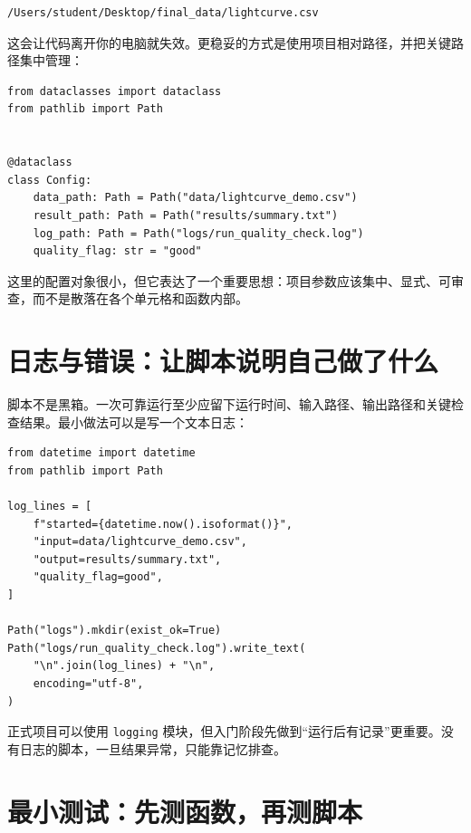 \begin{lstlisting}[style=terminal]
/Users/student/Desktop/final_data/lightcurve.csv
\end{lstlisting}

这会让代码离开你的电脑就失效。更稳妥的方式是使用项目相对路径，并把关键路径集中管理：

\begin{examplebox}[最小配置对象]
\begin{lstlisting}[style=pythonstyle]
from dataclasses import dataclass
from pathlib import Path


@dataclass
class Config:
    data_path: Path = Path("data/lightcurve_demo.csv")
    result_path: Path = Path("results/summary.txt")
    log_path: Path = Path("logs/run_quality_check.log")
    quality_flag: str = "good"
\end{lstlisting}
\end{examplebox}

这里的配置对象很小，但它表达了一个重要思想：项目参数应该集中、显式、可审查，而不是散落在各个单元格和函数内部。

\section{日志与错误：让脚本说明自己做了什么}

脚本不是黑箱。一次可靠运行至少应留下运行时间、输入路径、输出路径和关键检查结果。最小做法可以是写一个文本日志：

\begin{examplebox}[最小日志写法]
\begin{lstlisting}[style=pythonstyle]
from datetime import datetime
from pathlib import Path

log_lines = [
    f"started={datetime.now().isoformat()}",
    "input=data/lightcurve_demo.csv",
    "output=results/summary.txt",
    "quality_flag=good",
]

Path("logs").mkdir(exist_ok=True)
Path("logs/run_quality_check.log").write_text(
    "\n".join(log_lines) + "\n",
    encoding="utf-8",
)
\end{lstlisting}
\end{examplebox}

正式项目可以使用 \texttt{logging} 模块，但入门阶段先做到“运行后有记录”更重要。没有日志的脚本，一旦结果异常，只能靠记忆排查。

\section{最小测试：先测函数，再测脚本}

